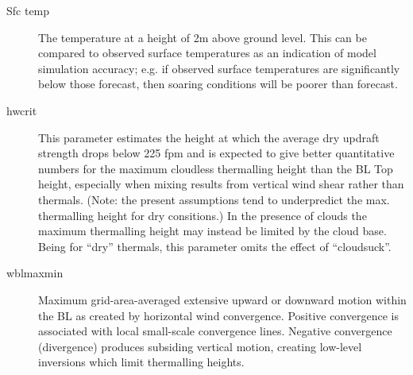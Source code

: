 \documentclass[a4paper,12pt]{refrep}
\begin{document}
\begin{description}
\item[Sfc temp] 
The temperature at a height of 2m above ground level.  This can be
compared to observed surface temperatures as an indication of model
simulation accuracy; e.g. if observed surface temperatures are
significantly below those forecast, then soaring conditions will be
poorer than forecast.
\item[hwcrit]  
This parameter estimates the height at which the average dry updraft
strength drops below 225 fpm and is expected to give better
quantitative numbers for the maximum cloudless thermalling height than
the BL Top height, especially when mixing results from vertical wind
shear rather than thermals.  (Note: the present assumptions tend to
underpredict the max. thermalling height for dry consitions.) In the
presence of clouds the maximum thermalling height may instead be
limited by the cloud base.  Being for ``dry'' thermals, this parameter
omits the effect of ``cloudsuck''.
\item[wblmaxmin]  
Maximum grid-area-averaged extensive upward or downward motion within
the BL as created by horizontal wind convergence. Positive convergence
is associated with local small-scale convergence lines.  Negative
convergence (divergence) produces subsiding vertical motion, creating
low-level inversions which limit thermalling heights.
\end{description}
\end{document}
